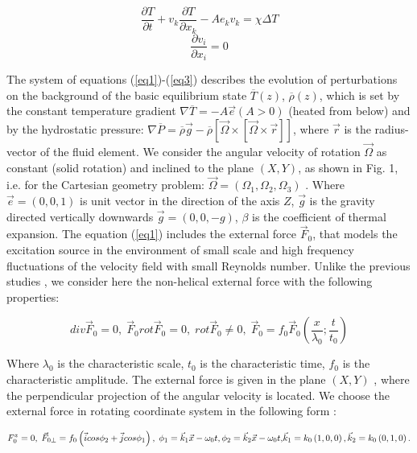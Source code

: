 \documentclass [12pt]{article}
\begin{document}
\begin{equation} \label{eq2}
  \frac{\partial T}{\partial t} +v_{k} \frac{
\partial T}{\partial x_{k} } -Ae_{k} v_{k} =\chi \Delta T
\end{equation}
\begin{equation} \label{eq3}
  \frac{\partial v_{i} }{\partial x_{i} } =0
\end{equation}


The system of equations (\ref{eq1})-(\ref{eq3}) describes the evolution of perturbations on the background of the basic equilibrium state $\overline{T}\left(z\right)$,  $\overline{\rho}\left(z\right)$, which is set by the constant temperature gradient $\nabla \overline{T}=-A\vec{e}(A>0)$ (heated from below) and by the hydrostatic pressure: $\nabla \overline{P}=\overline{\rho }\vec{g}-\overline{\rho }\left[\vec{\Omega }\times \left[\vec{\Omega }\times \vec{r}\right]\right]$, where $\vec{r}$ is the radius-vector of the fluid element. We consider the angular velocity of rotation $\vec{\Omega }$ as constant (solid rotation) and inclined to the plane $(X,Y)$, as shown in Fig. 1, i.e. for the Cartesian geometry problem: $\vec{\Omega }=\left(\Omega _{1} ,\Omega _{2} ,\Omega _{3} \right)$ . Where $\vec{e}=(0,0,1)$ is  unit vector in the direction of the axis $Z$, $\vec{g}$ is the gravity directed vertically downwards $\vec{g}=(0,0,-g)$, $\beta $ is the coefficient of thermal expansion. The equation (\ref{eq1}) includes the external force $\vec{F}_{0} $, that models the excitation source in the environment of small scale and high frequency fluctuations of the velocity field with small Reynolds number. Unlike the  previous studies \cite{14s}, \cite{15s} we consider here the non-helical external force with the following properties:

\begin{equation} \label{eq4}
div\vec{F}_{0} =0, \; \vec{F}_{0} rot\vec{F}_{0}
=0,\;  rot\vec{F}_{0} \ne 0 , \;    \vec{F}_{0} =f_{0} \vec{F}_{0} \left(\frac{x}{\lambda
_{0} } ;  \frac{t}{t_{0} } \right)
\end{equation}

Where $\lambda _{0} $ is the characteristic scale, $t_{0}$ is the characteristic time, $f_{0} $ is the characteristic amplitude. The external force is given in the plane $(X,Y)$ , where the perpendicular projection of the angular velocity is located. We choose the external force in rotating coordinate system in the following form :

\begin{equation} \label{eq5}
F_{0} ^{z} =0,\;\vec{F}_{0\bot } =f_{0} \left(\vec{i}cos\phi _{2} +\vec{j}cos\phi _{1}
\right),\; \phi _{1} =\vec{k}_{1} \vec{x}-\omega _{0} t,\phi _{2}
=\vec{k}_{2} \vec{x}-\omega _{0} t,$$
$$\vec{k}_{1}=k_{0} \left(1,0,0\right),\vec{k}_{2} =k_{0} \left(0,1,0\right).
\end{equation}
\end{document}
